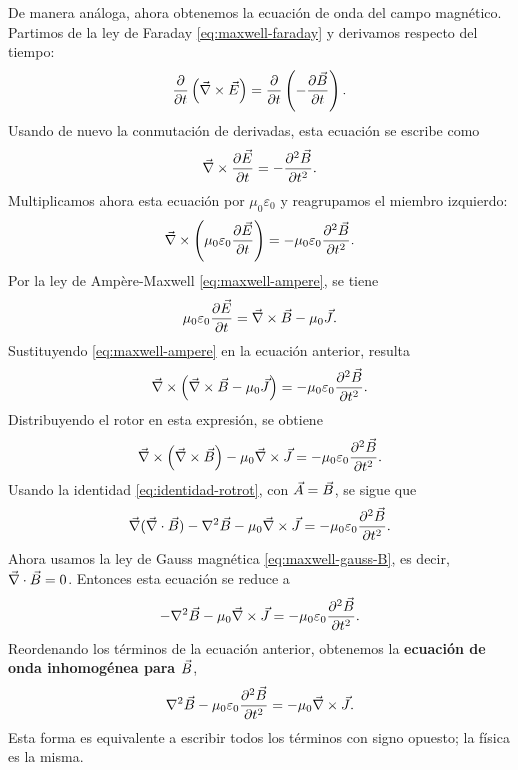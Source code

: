 \documentclass[../main.tex]{subfiles}
\begin{document}
De manera análoga, ahora obtenemos la ecuación de onda del campo magnético. Partimos de la ley de Faraday \eqref{eq:maxwell-faraday} y derivamos respecto del tiempo:
\begin{equation*}
    \frac{\partial }{\partial t}\left(\vec \nabla \times \vec{E}\right)=\frac{\partial }{\partial t}\left(-\frac{\partial \vec{B}}{\partial t}\right).
\end{equation*}
Usando de nuevo la conmutación de derivadas, esta ecuación se escribe como
\begin{equation*}
    \vec \nabla \times \frac{\partial \vec{E}}{\partial t}= -\frac{\partial^2 \vec{B}}{\partial t^2}.
\end{equation*}
Multiplicamos ahora esta ecuación por $\mu_0\varepsilon_0$ y reagrupamos el miembro izquierdo:
\begin{equation*}
    \vec \nabla \times \left(\mu_0\varepsilon_0\frac{\partial \vec{E}}{\partial t}\right)= -\mu_0\varepsilon_0\frac{\partial^2 \vec{B}}{\partial t^2}.
\end{equation*}
Por la ley de Ampère-Maxwell \eqref{eq:maxwell-ampere}, se tiene
\begin{equation*}
    \mu_0\varepsilon_0\frac{\partial \vec{E}}{\partial t}=\vec\nabla\times\vec{B}-\mu_0\vec{J}.
\end{equation*}
Sustituyendo \eqref{eq:maxwell-ampere} en la ecuación anterior, resulta
\begin{equation*}
    \vec \nabla \times \left(\vec\nabla\times\vec{B}-\mu_0\vec{J}\right)= -\mu_0\varepsilon_0\frac{\partial^2 \vec{B}}{\partial t^2}.
\end{equation*}
Distribuyendo el rotor en esta expresión, se obtiene
\begin{equation*}
    \vec \nabla \times \left(\vec\nabla\times\vec{B}\right)-\mu_0\vec \nabla \times \vec{J}= -\mu_0\varepsilon_0\frac{\partial^2 \vec{B}}{\partial t^2}.
\end{equation*}
Usando la identidad \eqref{eq:identidad-rotrot}, con $\vec A=\vec{B}$, se sigue que
\begin{equation*}
    \vec\nabla(\vec\nabla\cdot\vec B)-\nabla^2\vec B-\mu_0\vec \nabla \times \vec{J}= -\mu_0\varepsilon_0\frac{\partial^2 \vec{B}}{\partial t^2}.
\end{equation*}
Ahora usamos la ley de Gauss magnética \eqref{eq:maxwell-gauss-B}, es decir, $\vec\nabla\cdot\vec{B}=0$. Entonces esta ecuación se reduce a
\begin{equation*}
    -\nabla^2\vec B-\mu_0\vec \nabla \times \vec{J}= -\mu_0\varepsilon_0\frac{\partial^2 \vec{B}}{\partial t^2}.
\end{equation*}
Reordenando los términos de la ecuación anterior, obtenemos la \textbf{ecuación de onda inhomogénea para $\vec{B}$},
\begin{equation*}
    \nabla^2\vec B-\mu_0\varepsilon_0\frac{\partial^2 \vec{B}}{\partial t^2}= -\mu_0\vec \nabla \times \vec{J}.
\end{equation*}
Esta forma es equivalente a escribir todos los términos con signo opuesto; la física es la misma.
\end{document}
